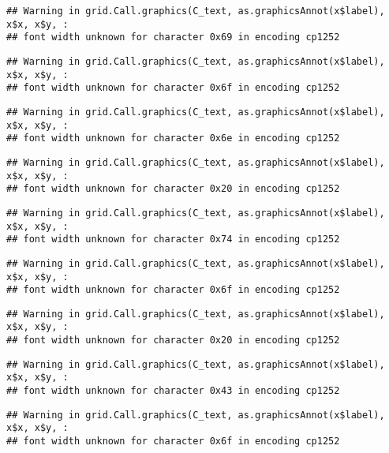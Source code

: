 \documentclass[
]{article}
\begin{document}
\begin{verbatim}
## Warning in grid.Call.graphics(C_text, as.graphicsAnnot(x$label), x$x, x$y, :
## font width unknown for character 0x69 in encoding cp1252
\end{verbatim}

\begin{verbatim}
## Warning in grid.Call.graphics(C_text, as.graphicsAnnot(x$label), x$x, x$y, :
## font width unknown for character 0x6f in encoding cp1252
\end{verbatim}

\begin{verbatim}
## Warning in grid.Call.graphics(C_text, as.graphicsAnnot(x$label), x$x, x$y, :
## font width unknown for character 0x6e in encoding cp1252
\end{verbatim}

\begin{verbatim}
## Warning in grid.Call.graphics(C_text, as.graphicsAnnot(x$label), x$x, x$y, :
## font width unknown for character 0x20 in encoding cp1252
\end{verbatim}

\begin{verbatim}
## Warning in grid.Call.graphics(C_text, as.graphicsAnnot(x$label), x$x, x$y, :
## font width unknown for character 0x74 in encoding cp1252
\end{verbatim}

\begin{verbatim}
## Warning in grid.Call.graphics(C_text, as.graphicsAnnot(x$label), x$x, x$y, :
## font width unknown for character 0x6f in encoding cp1252
\end{verbatim}

\begin{verbatim}
## Warning in grid.Call.graphics(C_text, as.graphicsAnnot(x$label), x$x, x$y, :
## font width unknown for character 0x20 in encoding cp1252
\end{verbatim}

\begin{verbatim}
## Warning in grid.Call.graphics(C_text, as.graphicsAnnot(x$label), x$x, x$y, :
## font width unknown for character 0x43 in encoding cp1252
\end{verbatim}

\begin{verbatim}
## Warning in grid.Call.graphics(C_text, as.graphicsAnnot(x$label), x$x, x$y, :
## font width unknown for character 0x6f in encoding cp1252
\end{verbatim}
\end{document}
